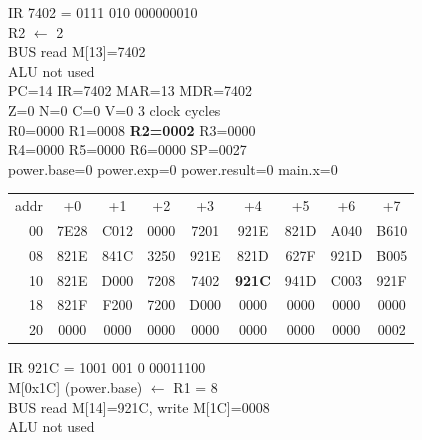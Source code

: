\noindent\begin{tcolorbox}[stepbox, title={Step 4 \hfill PC 13 \quad LI R2, 2}]
\textcolor{dim}{IR} 7402 = 0111 010 000000010\\
R2 $\leftarrow$ 2\\
\textcolor{dim}{BUS} read M[13]=7402\\
\textcolor{dim}{ALU} \textcolor{dim}{not used}\\
PC=14 IR=7402 MAR=13 MDR=7402\\
Z=0 N=0 C=0 V=0 \hfill \textcolor{dim}{3 clock cycles}\\
R0=0000 R1=0008 \textcolor{wrt}{\textbf{R2=0002}} R3=0000\\
R4=0000 R5=0000 R6=0000 SP=0027\\
\textcolor{dim}{power.base=0  power.exp=0  power.result=0  main.x=0}\\[1pt]
{\setlength{\tabcolsep}{1.6pt}\begin{tabular}{@{}r*{8}{c}@{}}
\textcolor{dim}{addr} & \textcolor{dim}{+0} & \textcolor{dim}{+1} & \textcolor{dim}{+2} & \textcolor{dim}{+3} & \textcolor{dim}{+4} & \textcolor{dim}{+5} & \textcolor{dim}{+6} & \textcolor{dim}{+7}\\
\textcolor{dim}{00} & 7E28 & C012 & 0000 & 7201 & 921E & 821D & A040 & B610\\
\textcolor{dim}{08} & 821E & 841C & 3250 & 921E & 821D & 627F & 921D & B005\\
\textcolor{dim}{10} & 821E & D000 & 7208 & 7402 & \cellcolor{pcc}\textbf{921C} & 941D & C003 & 921F\\
\textcolor{dim}{18} & 821F & F200 & 7200 & D000 & \cellcolor{datac}0000 & \cellcolor{datac}0000 & \cellcolor{datac}0000 & \cellcolor{datac}0000\\
\textcolor{dim}{20} & \cellcolor{stackc}0000 & \cellcolor{stackc}0000 & \cellcolor{stackc}0000 & \cellcolor{stackc}0000 & \cellcolor{stackc}0000 & \cellcolor{stackc}0000 & \cellcolor{stackc}0000 & \cellcolor{stackc}0002\\
\end{tabular}}
\end{tcolorbox}\hfill\begin{tcolorbox}[stepbox, title={Step 5 \hfill PC 14 \quad ST R1, power.base}]
\textcolor{dim}{IR} 921C = 1001 001 0 00011100\\
M[0x1C] (power.base) $\leftarrow$ R1 = 8\\
\textcolor{dim}{BUS} read M[14]=921C, \textcolor{wrt}{write M[1C]=0008}\\
\textcolor{dim}{ALU} \textcolor{dim}{not used}\\

\end{tcolorbox}
